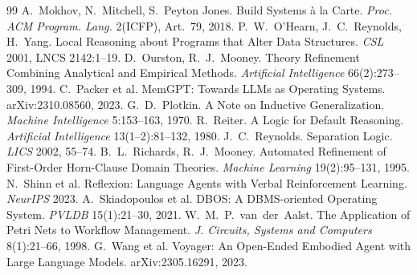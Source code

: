 \documentclass[11pt]{article}
\begin{document}
\begin{thebibliography}{99}
 A.~Mokhov, N.~Mitchell, S.~Peyton Jones. Build Systems à la Carte. \emph{Proc. ACM Program. Lang.} 2(ICFP), Art.~79, 2018.
 P.~W.~O'Hearn, J.~C.~Reynolds, H.~Yang. Local Reasoning about Programs that Alter Data Structures. \emph{CSL} 2001, LNCS 2142:1--19.
 D.~Ourston, R.~J.~Mooney. Theory Refinement Combining Analytical and Empirical Methods. \emph{Artificial Intelligence} 66(2):273--309, 1994.
 C.~Packer et al. MemGPT: Towards LLMs as Operating Systems. arXiv:2310.08560, 2023.
 G.~D.~Plotkin. A Note on Inductive Generalization. \emph{Machine Intelligence} 5:153--163, 1970.
 R.~Reiter. A Logic for Default Reasoning. \emph{Artificial Intelligence} 13(1--2):81--132, 1980.
 J.~C.~Reynolds. Separation Logic. \emph{LICS} 2002, 55--74.
 B.~L.~Richards, R.~J.~Mooney. Automated Refinement of First-Order Horn-Clause Domain Theories. \emph{Machine Learning} 19(2):95--131, 1995.
 N.~Shinn et al. Reflexion: Language Agents with Verbal Reinforcement Learning. \emph{NeurIPS} 2023.
 A.~Skiadopoulos et al. DBOS: A DBMS-oriented Operating System. \emph{PVLDB} 15(1):21--30, 2021.
 W.~M.~P.~van~der~Aalst. The Application of Petri Nets to Workflow Management. \emph{J. Circuits, Systems and Computers} 8(1):21--66, 1998.
 G.~Wang et al. Voyager: An Open-Ended Embodied Agent with Large Language Models. arXiv:2305.16291, 2023.
\end{thebibliography}
\end{document}
